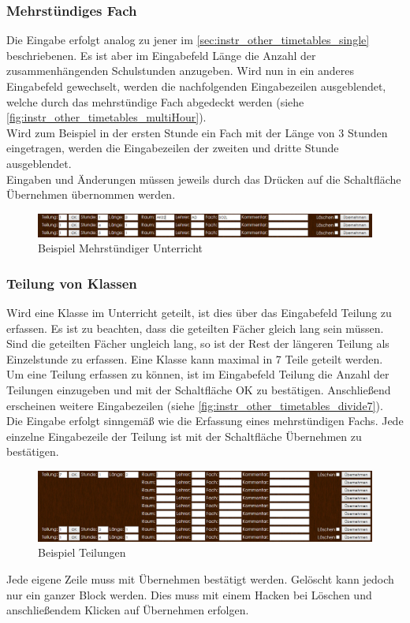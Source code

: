 \subsubsection{Mehrstündiges Fach}
Die Eingabe erfolgt analog zu jener im \autoref{sec:instr_other_timetables_single} beschriebenen. Es ist aber im Eingabefeld Länge die Anzahl der zusammenhängenden Schulstunden anzugeben. Wird nun in ein anderes Eingabefeld gewechselt, werden die nachfolgenden Eingabezeilen ausgeblendet, welche durch das mehrstündige Fach abgedeckt werden (siehe \autoref{fig:instr_other_timetables_multiHour}).\\
Wird zum Beispiel in der ersten Stunde ein Fach mit der Länge von 3 Stunden eingetragen, werden die Eingabezeilen der zweiten und dritte Stunde ausgeblendet.\\
Eingaben und Änderungen müssen jeweils durch das Drücken auf die Schaltfläche Übernehmen übernommen werden.
\begin{figure}[H]
\centering
\includegraphics[keepaspectratio=true, width=17cm]{images/screenshots/timetables_input_multiHour.png}
\caption{Beispiel Mehrstündiger Unterricht}
\label{fig:instr_other_timetables_multiHour}
\end{figure}
\subsubsection{Teilung von Klassen}
Wird eine Klasse im Unterricht geteilt, ist dies über das Eingabefeld Teilung zu erfassen. Es ist zu beachten, dass die geteilten Fächer gleich lang sein müssen. Sind die geteilten Fächer ungleich lang, so ist der Rest der längeren Teilung als Einzelstunde zu erfassen. Eine Klasse kann maximal in 7 Teile geteilt werden.\\
Um eine Teilung erfassen zu können, ist im Eingabefeld Teilung die Anzahl der Teilungen einzugeben und mit der Schaltfläche OK zu bestätigen. Anschließend erscheinen weitere Eingabezeilen (siehe \autoref{fig:instr_other_timetables_divide7}).\\
Die Eingabe erfolgt sinngemäß wie die Erfassung eines mehrstündigen Fachs. Jede einzelne Eingabezeile der Teilung ist mit der Schaltfläche Übernehmen zu bestätigen.
\begin{figure}[H]
\centering
\includegraphics[keepaspectratio=true, width=17cm]{images/screenshots/timetables_input_divide7.png}
\caption{Beispiel Teilungen}
\label{fig:instr_other_timetables_divide7}
\end{figure}
Jede eigene Zeile muss mit Übernehmen bestätigt werden. Gelöscht kann jedoch nur ein ganzer Block werden. Dies muss mit einem Hacken bei Löschen und anschließendem Klicken auf Übernehmen erfolgen.
